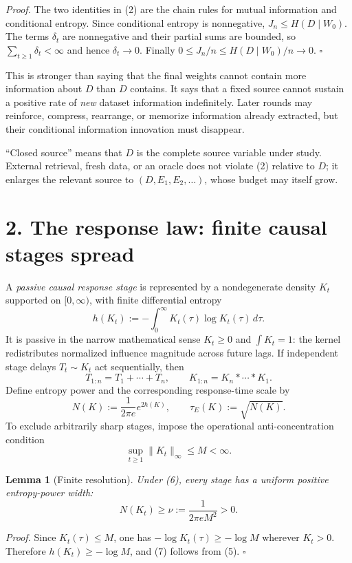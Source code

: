 \documentclass[10pt]{article}
\theoremstyle{compact}
\newtheorem{lemma}{Lemma}
\newcommand{\EP}{N}
\begin{document}
\emph{Proof.}
The two identities in (2) are the chain rules for mutual information and conditional entropy. Since conditional entropy is nonnegative, $J_n\le H(D\mid W_0)$. The terms $\delta_t$ are nonnegative and their partial sums are bounded, so $\sum_{t\ge1}\delta_t<\infty$ and hence $\delta_t\to0$. Finally $0\le J_n/n\le H(D\mid W_0)/n\to0$. \hfill$\square$

This is stronger than saying that the final weights cannot contain more information about $D$ than $D$ contains. It says that a fixed source cannot sustain a positive rate of \emph{new} dataset information indefinitely. Later rounds may reinforce, compress, rearrange, or memorize information already extracted, but their conditional information innovation must disappear.

``Closed source'' means that $D$ is the complete source variable under study. External retrieval, fresh data, or an oracle does not violate (2) relative to $D$; it enlarges the relevant source to $(D,E_1,E_2,\ldots)$, whose budget may itself grow.

\newpage
\section*{2. The response law: finite causal stages spread}
A \emph{passive causal response stage} is represented by a nondegenerate density $K_t$ supported on $[0,\infty)$, with finite differential entropy
\[
h(K_t):=-\int_0^\infty K_t(\tau)\log K_t(\tau)\,d\tau.
\]
It is passive in the narrow mathematical sense $K_t\ge0$ and $\int K_t=1$: the kernel redistributes normalized influence magnitude across future lags. If independent stage delays $T_t\sim K_t$ act sequentially, then
\[
T_{1:n}=T_1+\cdots+T_n,
\qquad
K_{1:n}=K_n*\cdots*K_1.
\tag{4}
\]
Define entropy power and the corresponding response-time scale by
\[
\EP(K):=\frac{1}{2\pi e}e^{2h(K)},
\qquad
\tau_{\!E}(K):=\sqrt{\EP(K)}.
\tag{5}
\]
To exclude arbitrarily sharp stages, impose the operational anti-concentration condition
\[
\sup_{t\ge1}\|K_t\|_\infty\le M<\infty.
\tag{6}
\]

\begin{lemma}[Finite resolution]
Under (6), every stage has a uniform positive entropy-power width:
\[
\EP(K_t)\ge \nu:=\frac{1}{2\pi eM^2}>0.
\tag{7}
\]
\end{lemma}

\emph{Proof.}
Since $K_t(\tau)\le M$, one has $-\log K_t(\tau)\ge-\log M$ wherever $K_t>0$. Therefore $h(K_t)\ge-\log M$, and (7) follows from (5). \hfill$\square$
\end{document}
